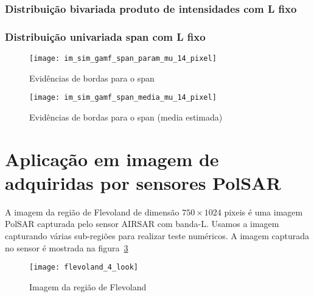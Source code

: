 \begin{figure*}[hbt]
	\centering
    \caption{Evidências de bordas para os três canais de intensidade com $\mu$ estimado.}
     \label{evidencias_hh_hv_vv_gamf} 
   \end{figure*}


\subsubsection{Distribuição bivariada produto de intensidades com L fixo}


\subsubsection{Distribuição univariada span com L fixo}    
    
\begin{figure}[hbt]
	\centering
	\texttt{[image: im\_sim\_gamf\_span\_param\_mu\_14\_pixel]}%
	\caption{Evidências de bordas para o span}
\label{fig:evidencias_span_gamf}
\end{figure}
    
    
    
\begin{figure}[hbt]
	\centering
	\texttt{[image: im\_sim\_gamf\_span\_media\_mu\_14\_pixel]}%
	\caption{Evidências de bordas para o span (media estimada)}
\label{fig:evidencias_span_gamf}
\end{figure}

\clearpage
\section{Aplicação em imagem de adquiridas por sensores PolSAR}


A imagem da região de Flevoland de dimensão $750\times 1024$ pixeis é uma imagem PolSAR capturada pelo sensor AIRSAR com banda-L. Usamos a imagem capturando várias sub-regiões para realizar teste numéricos. A imagem capturada no sensor é mostrada na figura~\ref{flevoland_4_look} 
\begin{figure}[hbt]
	\centering
	\texttt{[image: flevoland\_4\_look]}%
	\caption{Imagem da região de Flevoland}
\label{flevoland_4_look}
\end{figure}

